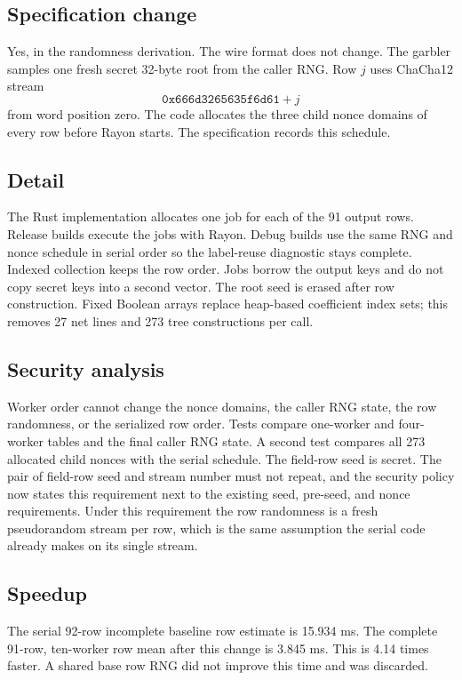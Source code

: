 \documentclass[10pt]{article}
\begin{document}
\subsection{Specification change}
Yes, in the randomness derivation.
The wire format does not change.
The garbler samples one fresh secret 32-byte root from the caller RNG.
Row $j$ uses ChaCha12 stream
\[
  \mathtt{0x666d3265635f6d61}+j
\]
from word position zero.
The code allocates the three child nonce domains of every row before Rayon starts.
The specification records this schedule.

\subsection{Detail}
The Rust implementation allocates one job for each of the 91 output rows.
Release builds execute the jobs with Rayon.
Debug builds use the same RNG and nonce schedule in serial order so the label-reuse diagnostic stays complete.
Indexed collection keeps the row order.
Jobs borrow the output keys and do not copy secret keys into a second vector.
The root seed is erased after row construction.
Fixed Boolean arrays replace heap-based coefficient index sets; this removes 27 net lines and 273 tree constructions per call.

\subsection{Security analysis}
Worker order cannot change the nonce domains, the caller RNG state, the row randomness, or the serialized row order.
Tests compare one-worker and four-worker tables and the final caller RNG state.
A second test compares all 273 allocated child nonces with the serial schedule.
The field-row seed is secret.
The pair of field-row seed and stream number must not repeat, and the security policy now states this requirement next to the existing seed, pre-seed, and nonce requirements.
Under this requirement the row randomness is a fresh pseudorandom stream per row, which is the same assumption the serial code already makes on its single stream.

\subsection{Speedup}
The serial 92-row incomplete baseline row estimate is 15.934 ms.
The complete 91-row, ten-worker row mean after this change is 3.845 ms.
This is 4.14 times faster.
A shared base row RNG did not improve this time and was discarded.
\end{document}
